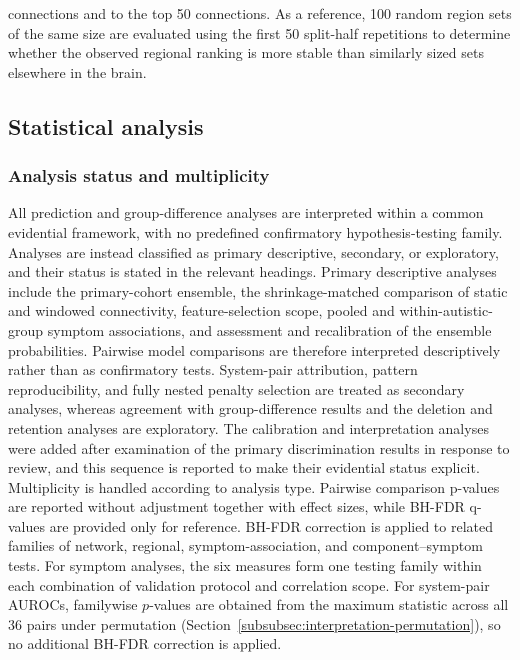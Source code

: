 connections and to the top 50 connections. As a reference, 100 random region sets of the same size are evaluated using the first 50 split-half repetitions to determine whether the observed regional ranking is more stable than similarly sized sets elsewhere in the brain.

\subsection{Statistical analysis}
\label{subsec:statistical-analysis}

\subsubsection{Analysis status and multiplicity}
\label{subsubsec:analysis-status}

All prediction and group-difference analyses are interpreted within a common evidential framework, with no predefined confirmatory hypothesis-testing family. Analyses are instead classified as primary descriptive, secondary, or exploratory, and their status is stated in the relevant headings. Primary descriptive analyses include the primary-cohort ensemble, the shrinkage-matched comparison of static and windowed connectivity, feature-selection scope, pooled and within-autistic-group symptom associations, and assessment and recalibration of the ensemble probabilities. Pairwise model comparisons are therefore interpreted descriptively rather than as confirmatory tests. System-pair attribution, pattern reproducibility, and fully nested penalty selection are treated as secondary analyses, whereas agreement with group-difference results and the deletion and retention analyses are exploratory. The calibration and interpretation analyses were added after examination of the primary discrimination results in response to review, and this sequence is reported to make their evidential status explicit. Multiplicity is handled according to analysis type. Pairwise comparison p-values are reported without adjustment together with effect sizes, while BH-FDR q-values are provided only for reference. BH-FDR correction is applied to related families of network, regional, symptom-association, and component--symptom tests. For symptom analyses, the six measures form one testing family within each combination of validation protocol and correlation scope. For system-pair AUROCs, familywise $p$-values are obtained from the maximum statistic across all 36 pairs under permutation (Section~\ref{subsubsec:interpretation-permutation}), so no additional BH-FDR correction is applied.


